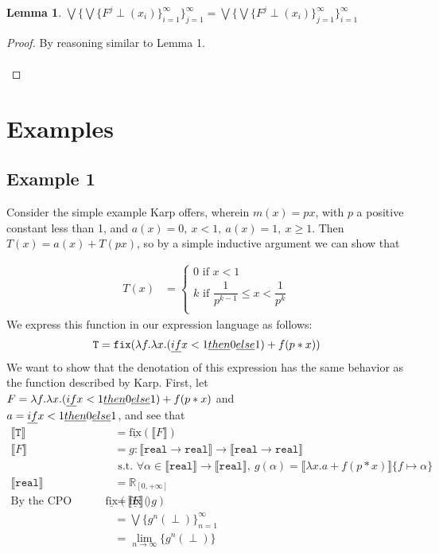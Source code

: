 \documentclass{westhesis}
\theoremstyle{plain}
\newtheorem{lemma}[thm]{Lemma}
\theoremstyle{definition}
\newcommand{\R}{\mathbb{R}}
\begin{document}
\begin{master}
 \begin{lemma}
 $\bigvee\{\bigvee\{F^j \perp(x_i)\}^{\infty}_{i=1}\}^{\infty}_{j=1} = \bigvee\{\bigvee\{F^j \perp(x_i)\}^{\infty}
 _{j=1}\}^{\infty}_{i=1}$\\ 
 \end{lemma}
 \begin{proof} 
 By reasoning similar to Lemma 1. \\ \\
 \end{proof}
 
\section{Examples}
\subsection{Example 1}
Consider the simple example Karp offers, wherein $m(x) = px$, with $p$ a positive constant less than 1, and $a(x) = 0, \ x < 1, \ a(x) = 1, \ x \geq 1$. Then $T(x) = a(x) + T(px)$, so by a simple inductive argument we can show that 
\end{master}
\begin{align*}
T(x) &= 
 \begin{cases}
 0 \text{ if } x < 1 \\
 k \text{ if }  \dfrac{1}{p^{k-1}} \leq x < \dfrac{1}{p^k} \\
 \end{cases}
 \end{align*}
 We express this function in our expression language as follows: 
 \begin{align*}
 \texttt{T} = \texttt{fix}(\lambda f. \lambda x. (\emph{if } x<1 \emph{ then } 0 \emph{ else } 1) + f (p * x))
 \end{align*}
 We want to show that the denotation of this expression has the same behavior as the function described by Karp. First, let $F 
 = \lambda f. \lambda x. (\emph{if } x<1 \emph{ then } 0 \emph{ else } 1) + f (p * x)$ and \\ $a = \emph{if } x<1 \emph{ then } 0 
 \emph{ else } 1$, and see that 
 \begin{align*}
 \llbracket \texttt{T} \rrbracket &= \underline{\text{fix}}(\llbracket F \rrbracket) \\
 \llbracket F \rrbracket &= g : \llbracket \texttt{real} \rightarrow \texttt{real}\rrbracket \rightarrow \llbracket \texttt{real} \rightarrow 
 \texttt{real}\rrbracket \\ &\text{ \ \ \ s.t. } \forall \alpha \in \llbracket \texttt{real}\rrbracket \rightarrow \llbracket \texttt{real}
 \rrbracket, \ 
 g(\alpha) = \llbracket \lambda x.a + f (p * x)\rrbracket\{f \mapsto \alpha\} \\
 \llbracket \texttt{real}\rrbracket &= \R_{[0, +\infty]}  
 \\\text{By the CPO fixpoint theorem, } \underline{\text{fix}}(\llbracket F \rrbracket) &= \underline{\text{fix}}(g) \\
&= \bigvee\{g^n (\perp)\}^{\infty}_{n=1} \\
&= \lim_{n \to \infty}\{g^n (\perp)\}
 \end{align*}
\end{document}
